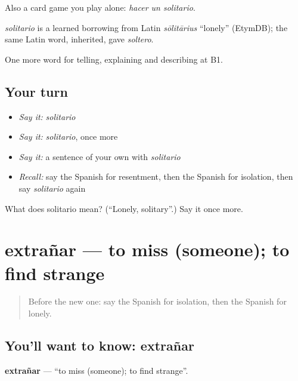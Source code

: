 Also a card game you play alone: \emph{hacer un solitario}.

\begin{cousinweb}
\emph{solitario} is a learned borrowing from Latin \emph{sōlitārius} \textquotedblleft{}lonely\textquotedblright{} (EtymDB); the same Latin word, inherited, gave \emph{soltero}.
\end{cousinweb}

\begin{grammarlens}[title={What you've built}]
One more word for telling, explaining and describing at B1.
\end{grammarlens}

\subsection*{Your turn}
\begin{itemize}
\raggedright
  \item \emph{Say it:} \emph{solitario}
  \item \emph{Say it:} \emph{solitario}, once more
  \item \emph{Say it:} a sentence of your own with \emph{solitario}
  \item \emph{Recall:} say the Spanish for resentment, then the Spanish for isolation, then say \emph{solitario} again
\end{itemize}

\begin{tcolorbox}[breakable,colback=teal!4,colframe=teal!35!black,title={Before you move on}]
What does solitario mean? (\textquotedblleft{}Lonely, solitary\textquotedblright{}.) Say it once more.
\end{tcolorbox}
\section[extrañar]{extrañar — to miss (someone); to find strange}

\label{lesson:ES-C709-extranar}



\begin{quote}
Before the new one: say the Spanish for isolation, then the Spanish for lonely.
\end{quote}

\subsection*{You'll want to know: extrañar}
\textbf{extrañar} — \textquotedblleft{}to miss (someone); to find strange\textquotedblright{}.

